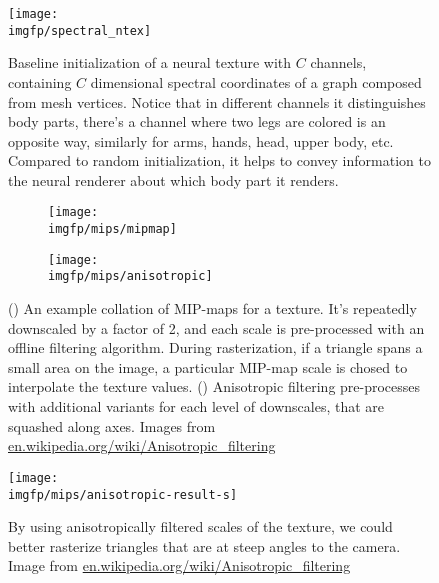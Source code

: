\begin{figure}
	\centering
	\texttt{[image: \\imgfp/spectral\_ntex]}
	\caption{Baseline initialization of a neural texture with $C$ channels, containing $C$ dimensional spectral coordinates of a graph composed from mesh vertices. Notice that in different channels it distinguishes body parts, there's a channel where two legs are colored is an opposite way, similarly for arms, hands, head, upper body, etc. Compared to random initialization, it helps to convey information to the neural renderer about which body part it renders.}
	\label{appb:aux:spectral_ntex}
\end{figure}
\begin{figure}
	\centering
	\begin{subfigure}[b]{0.48\textwidth}
		\centering
		\texttt{[image: \\imgfp/mips/mipmap]}%
		\caption{}
		\label{appb:aux:mipmap}
	\end{subfigure}
	\hfill
	\begin{subfigure}[b]{0.48\textwidth}
		\centering
		\texttt{[image: \\imgfp/mips/anisotropic]}
		\caption{}
		\label{appb:aux:anisotropic}
	\end{subfigure}
	\caption{(\protect{}) An example collation of MIP-maps for a texture. It's repeatedly downscaled by a factor of 2, and each scale is pre-processed with an offline filtering algorithm. During rasterization, if a triangle spans a small area on the image, a particular MIP-map scale is chosed to interpolate the texture values. (\protect{}) Anisotropic filtering pre-processes with additional variants for each level of downscales, that are squashed along axes. Images from \href{https://en.wikipedia.org/wiki/Anisotropic_filtering}{en.wikipedia.org/wiki/Anisotropic\_filtering}} 
\end{figure}
\begin{figure}
	\centering
	\texttt{[image: \\imgfp/mips/anisotropic-result-s]}
	\caption{By using anisotropically filtered scales of the texture, we could better rasterize triangles that are at steep angles to the camera. Image from \href{https://en.wikipedia.org/wiki/Anisotropic_filtering}{en.wikipedia.org/wiki/Anisotropic\_filtering}}
	\label{appb:aux:anisotropic_result}
\end{figure}

